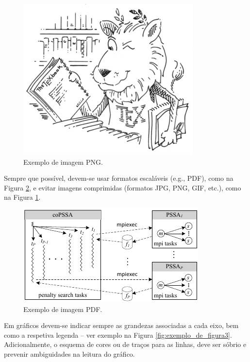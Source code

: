 \begin{figure}[htbp]
	\centering
	\includegraphics[scale=0.75]{images/lion_large}
	\caption{Exemplo de imagem PNG.}
	\label{fig:exemplo_de_figura}
\end{figure}

Sempre que possível, devem-se usar formatos escaláveis (e.g., PDF), como na Figura \ref{fig:exemplo_de_figura2}, e evitar imagens comprimidas (formatos JPG, PNG, GIF, etc.), como na Figura \ref{fig:exemplo_de_figura}.

\begin{figure}[htbp]
	\centering
	\includegraphics[width=0.75\linewidth]{images/architecture}
	\caption{Exemplo de imagem PDF.}
	\label{fig:exemplo_de_figura2}
\end{figure}


Em gráficos devem-se indicar sempre as grandezas associadas a cada eixo, bem como a respetiva legenda -- ver exemplo na Figura \ref{fig:exemplo_de_figura3}. Adicionalmente, o esquema de cores ou de traços para as linhas, deve ser sóbrio e prevenir ambiguidades na leitura do gráfico.


